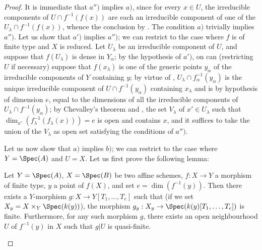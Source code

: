 \begin{proof}
It is immediate that $a'')$ implies $a)$, since for every $x\in U$, the irreducible components of $U\cap f^{-1}(f(x))$ are each an irreducible component of one of the $U_\lambda\cap f^{-1}(f(x))$, whence the conclusion by .
The condition $a)$ trivially implies $a'')$.
Let us show that $a')$ implies $a'')$; we can restrict to the case where $f$ is of finite type and $X$ is reduced.
Let $U_\lambda$ be an irreducible component of $U$, and suppose that $f(U_\lambda)$ is dense in $Y_\alpha$; by the hypothesis of $a')$, on can (restricting $U$ if necessary) suppose that $f(x_\lambda)$ is one of the generic points $y_\alpha$ of the irreducible components of $Y$ containing $y$; by virtue of , $U_\lambda\cap f_\alpha^{-1}(y_\alpha)$ is the unique irreducible component of $U\cap f^{-1}(y_\alpha)$ containing $x_\lambda$ and is by hypothesis of dimension $e$, equal to the dimensions of all the irreducible components of $U_\lambda\cap f^{-1}(y_\alpha)$; by Chevalley's theorem  and , the set $V_\lambda$ of $x'\in U_\lambda$ such that $\dim_{x'}(f_\lambda^{-1}(f_\lambda(x)))=e$ is open and contains $x$, and it suffices to take the union of the $V_\lambda$ as open set satisfying the conditions of $a'')$.

Let us now show that $a)$ implies $b)$; we can restrict to the case where $Y=\Spec(A)$ and $U=X$.
Let us first prove the following lemma:

\begin{lemma}[13.3.1.1]
\label{IV.13.3.1.1}
Let $Y=\Spec(A)$, $X=\Spec(B)$ be two affine schemes, $f:X\to Y$ a morphism of finite type, $y$ a point of $f(X)$, and set $e=\dim(f^{-1}(y))$.
Then there exists a $Y$-morphism $g:X\to Y[T_1,\ldots,T_e]$ such that (if we set $X_y=X\times_Y\Spec(k(y))$), the morphism $g_y:X_y\to\Spec(k(y)[T_1,\ldots,T_e])$ is finite.
Furthermore, for any such morphism $g$, there exists an open neighbourhood $U$ of $f^{-1}(y)$ in $X$ such that $g|U$ is quasi-finite.
\end{lemma}


\end{proof}
